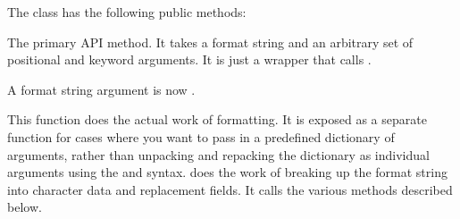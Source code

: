 \documentclass[letterpaper,10pt,english]{sphinxmanual}
\begin{document}
\begin{fulllineitems}
\label{\detokenize{string:string.Formatter}}
The {\hyperref[\detokenize{string:string.Formatter}]{}} class has the following public methods:

\begin{fulllineitems}
\label{\detokenize{string:string.Formatter.format}}
The primary API method.  It takes a format string and
an arbitrary set of positional and keyword arguments.
It is just a wrapper that calls {\hyperref[\detokenize{string:string.Formatter.vformat}]{}}.

A format string argument is now .

\end{fulllineitems}


\begin{fulllineitems}
\label{\detokenize{string:string.Formatter.vformat}}
This function does the actual work of formatting.  It is exposed as a
separate function for cases where you want to pass in a predefined
dictionary of arguments, rather than unpacking and repacking the
dictionary as individual arguments using the  and 
syntax.  {\hyperref[\detokenize{string:string.Formatter.vformat}]{}} does the work of breaking up the format string
into character data and replacement fields.  It calls the various
methods described below.


\end{fulllineitems}
\end{fulllineitems}
\end{document}
